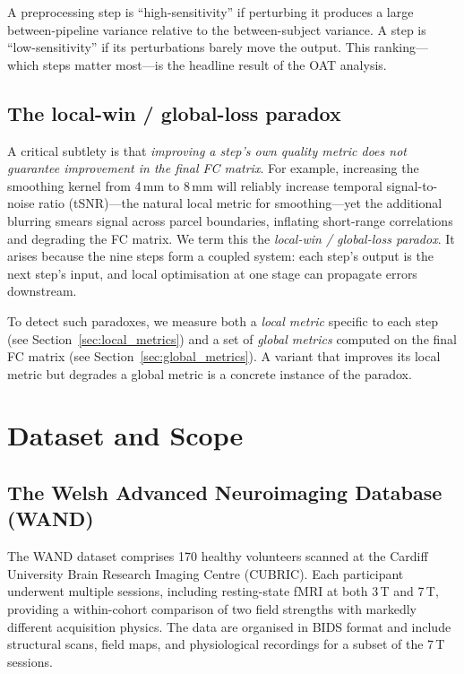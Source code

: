 \documentclass[11pt,a4paper]{article}
\begin{document}
A preprocessing step is ``high-sensitivity'' if perturbing it produces a large between-pipeline variance relative to the between-subject variance.  A step is ``low-sensitivity'' if its perturbations barely move the output.  This ranking---which steps matter most---is the headline result of the OAT analysis.

\subsection{The local-win / global-loss paradox}
\label{sec:paradox}

A critical subtlety is that \emph{improving a step's own quality metric does not guarantee improvement in the final FC matrix}.  For example, increasing the smoothing kernel from 4\,mm to 8\,mm will reliably increase temporal signal-to-noise ratio (tSNR)---the natural local metric for smoothing---yet the additional blurring smears signal across parcel boundaries, inflating short-range correlations and degrading the FC matrix.  We term this the \emph{local-win / global-loss paradox}.  It arises because the nine steps form a coupled system: each step's output is the next step's input, and local optimisation at one stage can propagate errors downstream.

To detect such paradoxes, we measure both a \emph{local metric} specific to each step (see Section~\ref{sec:local_metrics}) and a set of \emph{global metrics} computed on the final FC matrix (see Section~\ref{sec:global_metrics}).  A variant that improves its local metric but degrades a global metric is a concrete instance of the paradox.

\section{Dataset and Scope}

\subsection{The Welsh Advanced Neuroimaging Database (WAND)}

The WAND dataset \citep{wand2024} comprises 170 healthy volunteers scanned at the Cardiff University Brain Research Imaging Centre (CUBRIC).  Each participant underwent multiple sessions, including resting-state fMRI at both 3\,T and 7\,T, providing a within-cohort comparison of two field strengths with markedly different acquisition physics.  The data are organised in BIDS format and include structural scans, field maps, and physiological recordings for a subset of the 7\,T sessions.
\end{document}
